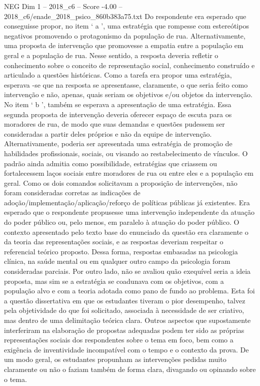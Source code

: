 \begin{textsample}{NEG Dim 1 – 2018\_c6 – Score -4.00 – 2018\_c6/enade\_2018\_psico\_860b383a75.txt}
Do respondente era esperado que conseguisse propor, no item ‘ a ’, uma estratégia que rompesse com estereótipos negativos promovendo o protagonismo da população de rua.
Alternativamente, uma proposta de intervenção que promovesse a empatia entre a população em geral e a população de rua.
Nesse sentido, a resposta deveria refletir o conhecimento sobre o conceito de representação social, conhecimento construído e articulado a questões históricas.
Como a tarefa era propor uma estratégia, esperava -se que na resposta se apresentasse, claramente, o que seria feito como intervenção e não, apenas, quais seriam os objetivos e/ou objetos da intervenção.
No item ‘ b ’, também se esperava a apresentação de uma estratégia.
Essa segunda proposta de intervenção deveria oferecer espaço de escuta para os moradores de rua, de modo que suas demandas e questões pudessem ser consideradas a partir deles próprios e não da equipe de intervenção.
Alternativamente, poderia ser apresentada uma estratégia de promoção de habilidades profissionais, sociais, ou visando ao restabelecimento de vínculos.
O padrão ainda admitia como possibilidade, estratégias que criassem ou fortalecessem laços sociais entre moradores de rua ou entre eles e a população em geral.
Como os dois comandos solicitavam a proposição de intervenções, não foram consideradas corretas as indicações de adoção/implementação/aplicação/reforço de políticas públicas já existentes.
Era esperado que o respondente propusesse uma intervenção independente da atuação do poder público ou, pelo menos, em paralelo à atuação do poder público.
O contexto apresentado pelo texto base do enunciado da questão era claramente o da teoria das representações sociais, e as respostas deveriam respeitar o referencial teórico proposto.
Dessa forma, respostas embasadas na psicologia clínica, na saúde mental ou em qualquer outro campo da psicologia foram consideradas parciais.
Por outro lado, não se avaliou quão exequível seria a ideia proposta, mas sim se a estratégia se coadunava com os objetivos, com a população alvo e com a teoria adotada como pano de fundo ao problema.
Esta foi a questão dissertativa em que os estudantes tiveram o pior desempenho, talvez pela objetividade do que foi solicitado, associada à necessidade de ser criativo, mas dentro de uma delimitação teórica clara.
Outros aspectos que supostamente interferiram na elaboração de propostas adequadas podem ter sido as próprias representações sociais dos respondentes sobre o tema em foco, bem como a exigência de inventividade incompatível com o tempo e o contexto da prova.
De um modo geral, os estudantes propunham as intervenções pedidas muito claramente ou não o faziam também de forma clara, divagando ou opinando sobre o tema.

\end{textsample}
